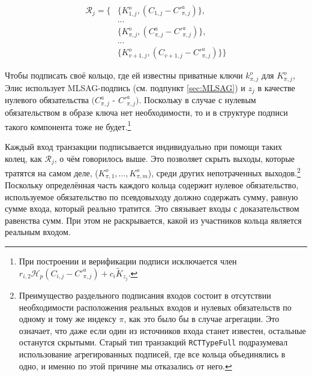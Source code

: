 
\begin{align*}
    \mathcal{R}_j = \{&\{K^o_{1, j}, (C_{1, j} - C'^a_{\pi, j})\}, \\
    &... \\
    &\{ K^o_{\pi, j}, (C^a_{\pi, j} - C'^a_{\pi, j})\}, \\
    &... \\
    &\{ K^o_{v+1, j}, (C_{v+1, j} - C'^a_{\pi, j})\}\}
\end{align*}

Чтобы подписать своё кольцо, где ей известны приватные ключи $k^o_{\pi,j}$ для $K^o_{\pi,j}$, Элис использу\-ет MLSAG-подпись (см. подпункт \ref{sec:MLSAG}) и $z_j$ в качестве нулевого обязательства $(C^a_{\pi,j}$ - $C'^a_{\pi,j})$. Поскольку в случае с нулевым обязательством в образе ключа нет необходимости, то и в структуре подписи такого компонента тоже не будет.\footnote{При построении и верификации подписи исключается член $r_{i,2} \mathcal{H}_p(C_{i, j} - C'^a_{\pi, j}) + c_i \tilde{K}_{z_j}$.}

Каждый вход транзакции подписывается индивидуально при помощи таких колец, как \(\mathcal{R}_j\), о чём говорилось выше. Это позволяет скрыть выходы, которые тратятся на самом деле, ($K^o_{\pi,1},...,K^o_{\pi,m}$), среди других непотраченных выходов.\footnote{Преимущество  раздельного подписания входов состоит в отсутствии необходимости расположения реальных входов и нулевых обязательств по одному и тому же индексу $\pi$, как это было бы в случае агрегации. Это означает, что даже если один из источников входа станет известен, остальные останутся скрытыми. Старый тип транзакций {\tt RCTTypeFull} подразумевал использование агрегированных подписей, где все кольца объединялись в одно, и именно по этой причине мы отказались от него.} Поскольку определённая часть каж\-дого кольца содержит нулевое обязательство, используемое обязательство по псевдовыходу должно содержать сумму, равную сумме входа, который реально тратится. Это связывает входы с доказательством равенства сумм. При этом не раскрывается, какой из участников кольца является реальным входом.

